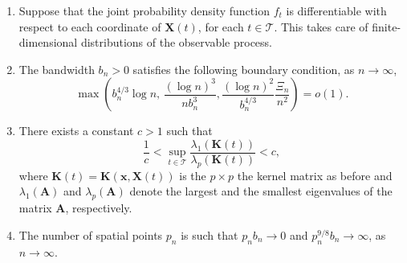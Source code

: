 \documentclass[aos]{imsart}
\theoremstyle{plain}
\theoremstyle{remark}
\newcommand{\Tcal}{\mathcal{T}}
\newcommand{\bb}[1]{\boldsymbol{#1}}
\newcommand{\kernel}[1]{\bb{K}(\bb{x}, \bb{X}(#1))}
\newcommand{\cnam}[1]{\textcolor{mypurple}{#1}}
\begin{document}
\begin{enumerate}[label=(B\arabic*),ref=(B\arabic*)]
     \item\label{assum:finite-dim} Suppose that the joint probability density function $f_{t}$ is differentiable with respect to each coordinate of $\bb{X}(t)$, for each $t \in \Tcal$. This takes care of finite-dimensional distributions of the observable process.
     \item\label{assum:bandwidth} The bandwidth $b_n>0$ satisfies the following boundary condition, as $n \rightarrow \infty$,
     \begin{equation*}
         \max \left( b_n^{4/3}\log n , \, \frac{(\log n)^3}{nb_n^3} , \frac{ (\log n)^2}{b_n^{4/3}} \frac{\Xi_n}{n^2}\right) = o(1).
    \end{equation*}
    \item\label{assum:kernelbound} There exists a constant $ c >1$ such that
    \begin{equation*}
        \dfrac{1}{c} < \sup_{t \in \Tcal} \dfrac{\lambda_1(\bb{K}(t))}{\lambda_p(\bb{K}(t))} < c,
    \end{equation*}
    \noindent where \cnam{$\bb{K}(t)= \kernel{t}$} is the $p\times p$ the kernel matrix as before and $\lambda_1(\bb{A})$ and $\lambda_p(\bb{A})$ denote  the largest and the smallest eigenvalues of the matrix $\bb{A}$, respectively.
    \item\label{assum:alpha-beta} The number of spatial points $p_n$ is such that $p_nb_n \rightarrow 0$ and $p_n^{9/8}b_n \rightarrow \infty$, as $n \rightarrow \infty$.
\end{enumerate}
\end{document}
